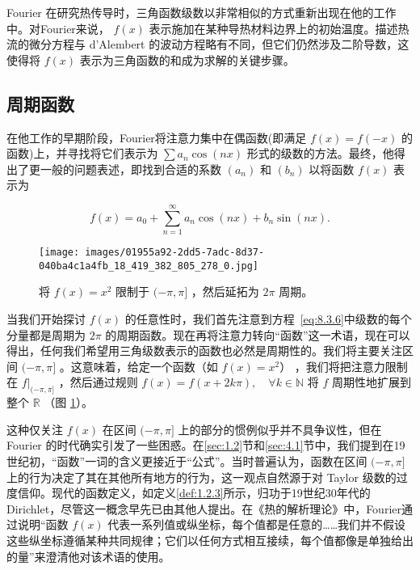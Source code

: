 Fourier 在研究热传导时，三角函数级数以非常相似的方式重新出现在他的工作中。对Fourier来说， \(f\left( x\right)\) 表示施加在某种导热材料边界上的初始温度。描述热流的微分方程与 d'Alembert 的波动方程略有不同，但它们仍然涉及二阶导数，这使得将 \(f\left( x\right)\) 表示为三角函数的和成为求解的关键步骤。

\subsection{周期函数}

在他工作的早期阶段，Fourier将注意力集中在偶函数(即满足 \(f\left( x\right)  = f\left( {-x}\right)\) 的函数)上，并寻找将它们表示为 \(\sum {a}_{n}\cos \left( {nx}\right)\) 形式的级数的方法。最终，他得出了更一般的问题表述，即找到合适的系数 \(\left( {a}_{n}\right)\) 和 \(\left( {b}_{n}\right)\) 以将函数 \(f\left( x\right)\) 表示为

\begin{equation}
\label{eq:8.3.6}
f\left( x\right)  = {a}_{0} + \mathop{\sum }\limits_{{n = 1}}^{\infty }{a}_{n}\cos \left( {nx}\right)  + {b}_{n}\sin \left( {nx}\right) .
\end{equation}


\begin{figure}[htbp]
  \centering
  \texttt{[image: images/01955a92-2dd5-7adc-8d37-040ba4c1a4fb\_18\_419\_382\_805\_278\_0.jpg]}

  \caption{ 将 \(f\left( x\right)  = {x}^{2}\) 限制于 \(( - \pi ,\pi \rbrack\) ，然后延拓为 \({2\pi }\) 周期。}
  \label{fig:8.1}
\end{figure}

当我们开始探讨 \(f\left( x\right)\) 的任意性时，我们首先注意到方程~\eqref{eq:8.3.6}中级数的每个分量都是周期为 \({2\pi }\) 的周期函数。现在再将注意力转向“函数”这一术语，现在可以得出，任何我们希望用三角级数表示的函数也必然是周期性的。我们将主要关注区间 \(( - \pi ,\pi \rbrack\) 。这意味着，给定一个函数（如 \(f\left( x\right)  = {x}^{2}\)） ，我们将把注意力限制在 \(f|_{( - \pi ,\pi \rbrack}\) ，然后通过规则 \(f\left( x\right)  = f\left( {x + {2k\pi }}\right), \quad \forall k \in \mathbb{N}\) 将 \(f\) 周期性地扩展到整个 \(\mathbb{R}\) （图 \ref{fig:8.1}）。

这种仅关注 \(f\left( x\right)\) 在区间 \(( - \pi ,\pi \rbrack\) 上的部分的惯例似乎并不具争议性，但在Fourier 的时代确实引发了一些困惑。在\ref{sec:1.2}节和\ref{sec:4.1}节中，我们提到在19世纪初，“函数”一词的含义更接近于“公式”。当时普遍认为，函数在区间 \(( - \pi ,\pi \rbrack\) 上的行为决定了其在其他所有地方的行为，这一观点自然源于对 Taylor 级数的过度信仰。现代的函数定义，如定义\ref{def:1.2.3}所示，归功于19世纪30年代的Dirichlet，尽管这一概念早先已由其他人提出。在《热的解析理论》中，Fourier通过说明“函数 \(f\left( x\right)\) 代表一系列值或纵坐标，每个值都是任意的……我们并不假设这些纵坐标遵循某种共同规律；它们以任何方式相互接续，每个值都像是单独给出的量”来澄清他对该术语的使用。

